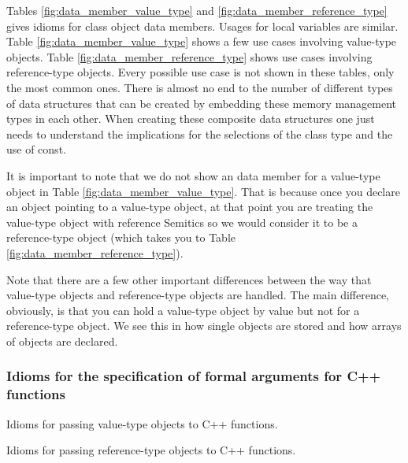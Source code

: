 \documentclass[pdf,ps2pdf,11pt]{SANDreport}
\begin{document}
Tables {}\ref{fig:data_member_value_type} and
{}\ref{fig:data_member_reference_type} gives idioms for class object
data members.  Usages for local variables are similar.  Table
{}\ref{fig:data_member_value_type} shows a few use cases involving
value-type objects.  Table {}\ref{fig:data_member_reference_type}
shows use cases involving reference-type objects.  Every possible use
case is not shown in these tables, only the most common ones.  There
is almost no end to the number of different types of data structures
that can be created by embedding these memory management types in each
other.  When creating these composite data structures one just needs
to understand the implications for the selections of the class type
and the use of const.

It is important to note that we do not show an {} data
member for a value-type object in Table
{}\ref{fig:data_member_value_type}.  That is because once you declare
an {} object pointing to a value-type object, at that
point you are treating the value-type object with reference Semitics
so we would consider it to be a reference-type object (which takes you
to Table {}\ref{fig:data_member_reference_type}).

Note that there are a few other important differences between the way
that value-type objects and reference-type objects are handled.  The
main difference, obviously, is that you can hold a value-type object
by value but not for a reference-type object.  We see this in how
single objects are stored and how arrays of objects are declared.


%
{}\subsubsection{Idioms for the specification of formal arguments for
C++ functions}
\label{sec:idioms-for-passing-arguments}
%

\begin{table}[p]
%
\begin{center}
%
%

%
%
%
\end{center}
\caption{\label{fig:func_args_value_type}
Idioms for passing value-type objects to C++ functions.}
%
\end{table}


\begin{table}[p]
%
\begin{center}

\end{center}
\caption{\label{fig:func_args_ref_type}
Idioms for passing reference-type objects to C++ functions.}
\end{table}
\end{document}
